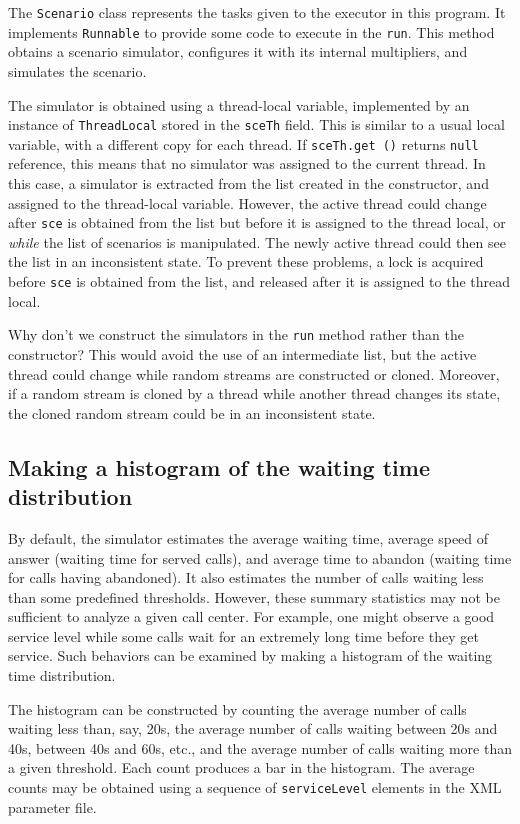 The \texttt{Scenario} class represents the tasks given to the executor
in this program.
It implements \texttt{Runnable} to provide some code to execute in the
\texttt{run}.
This method obtains a scenario simulator, configures it with its
internal multipliers, and simulates the scenario.

The simulator is obtained using a thread-local variable, implemented
by an instance of \texttt{Thread\-Local} stored in the \texttt{sceTh} field.
This is similar to a usual local variable, with a different copy for
each thread.
If \texttt{sceTh.get ()} returns \texttt{null} reference, this means
that no simulator was assigned to the current thread.
In this case, a simulator is extracted from the list created in the
constructor, and assigned to the thread-local variable.
However, the active thread could change after \texttt{sce} is obtained
from the list but before it is assigned to the thread local, or
\emph{while}  the list of scenarios is manipulated.
The newly active thread could then see the list in an inconsistent
state.
To prevent these problems, a lock is acquired before \texttt{sce} is
obtained from the list, and released after it is assigned to the
thread local.

Why don't we construct the simulators in the \texttt{run} method
rather than the constructor?
This would avoid the use of an intermediate list, but
the active thread could change while random streams are constructed
or cloned.
Moreover, if a random stream is cloned by a thread while another
thread changes its state, the cloned random stream could be in an
inconsistent state.

\subsection{Making a histogram of the waiting time distribution}

By default, the simulator estimates the average waiting time, average
speed of answer (waiting time for served calls), and average time to
abandon (waiting time for calls having abandoned).
It also estimates the number of calls waiting less than some
predefined thresholds.
However, these summary statistics may not be sufficient to analyze a
given call center.
For example, one might observe a good service level while some calls
wait for an extremely long time before they get service.
Such behaviors can be examined by making a histogram of the waiting
time distribution.

The histogram can be constructed by counting the average number of
calls waiting less than, say, 20s, the average number of calls waiting
between 20s and 40s, between 40s and 60s, etc.,
and the average number of calls waiting more than a given threshold.
Each count produces a bar in the histogram.
The average counts may be obtained using a sequence of
\texttt{service\-Level} elements in the XML parameter file.

